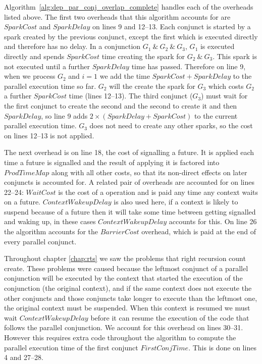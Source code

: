 Algorithm~\ref{alg:dep_par_conj_overlap_complete} handles each of the
overheads listed above.
The first two overheads that this algorithm accounts for are 
$SparkCost$ and $SparkDelay$ on lines 9 and 12--13.
Each conjunct is started by a spark created by the previous conjunct,
except the first which is executed directly and therefore has no delay.
In a conjunction $G_1~\&~G_2~\&~G_3$, $G_1$ is executed directly and spends
$SparkCost$ time creating the spark for $G_2~\&~G_3$.
This spark is not executed until a further $SparkDelay$ time has passed.
Therefore on line 9, when we process $G_2$ and $i = 1$ we add the time
$SparkCost + SparkDelay$ to the parallel execution time so far.
$G_2$ will the create the spark for $G_3$ which costs $G_2$ a further
$SparkCost$ time (lines 12--13).
The third conjunct ($G_3$) must wait for the first conjunct to create the
second and the second to create it and then $SparkDelay$,
so line 9 adds $2\times(SparkDelay + SparkCost)$ to the current parallel
execution time.
$G_3$ does not need to create any other sparks, so the cost on lines 12--13
is not applied.

The next overhead is on line 18, the cost of signalling a future.
It is applied each time a future is signalled and the result of applying it
is factored into $ProdTimeMap$ along with all other costs,
so that its non-direct effects on later conjuncts is accounted for.
A related pair of overheads are accounted for on lines 22--24:
$WaitCost$ is the cost of a \wait operation and is paid any time any context
waits on a future.
$ContextWakeupDelay$ is also used here, if a context is likely to suspend
because of a future then it will take some time between getting signalled and
waking up,
in these cases $ContextWakeupDelay$ accounts for this.
On line 26 the algorithm accounts for the $BarrierCost$ overhead,
which is paid at the end of every parallel conjunct.

Throughout chapter \ref{chap:rts} we saw the problems that right recursion
count create.
These problems were caused because the leftmost conjunct of a parallel
conjunction will be executed by the context that started the execution of
the conjunction (the original context),
and if the same context does not execute the other conjuncts and those
conjuncts take longer to execute than the leftmost one,
the original context must be suspended.
When this context is resumed we must wait $ContextWakeupDelay$ before it can
resume the execution of the code that follows the parallel conjunction.
We account for this overhead on lines 30--31.
However this requires extra code throughout the algorithm to compute the
parallel execution time of the first conjunct $FirstConjTime$.
This is done on lines 4 and 27--28.

